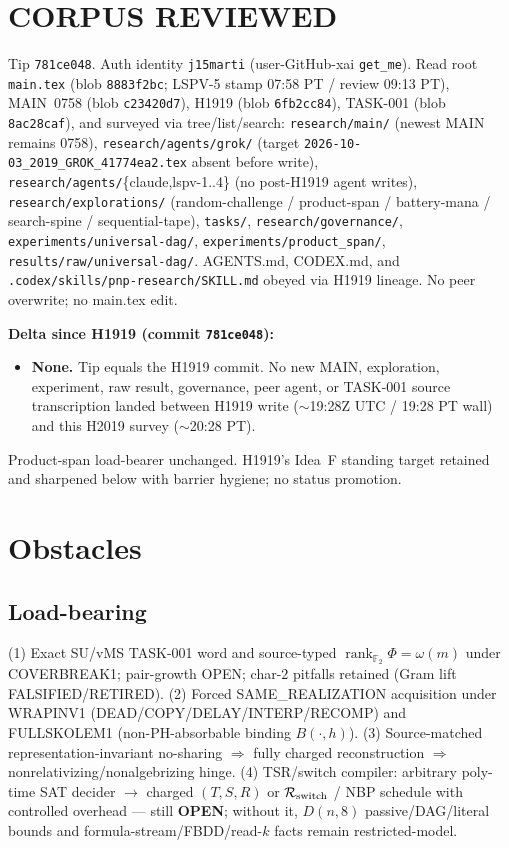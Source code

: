 \documentclass[11pt]{article}
\begin{document}
\section*{CORPUS REVIEWED}
Tip \texttt{781ce048}. Auth identity \texttt{j15marti}
(user-GitHub-xai \texttt{get\_me}).
Read root \texttt{main.tex} (blob \texttt{8883f2bc}; LSPV-5 stamp 07:58 PT / review 09:13 PT),
MAIN~0758 (blob \texttt{c23420d7}),
H1919 (blob \texttt{6fb2cc84}),
TASK-001 (blob \texttt{8ac28caf}),
and surveyed via tree/list/search:
\texttt{research/main/} (newest MAIN remains 0758),
\texttt{research/agents/grok/} (target \texttt{2026-10-03\_2019\_GROK\_41774ea2.tex} absent before write),
\texttt{research/agents/}\{claude,lspv-1..4\} (no post-H1919 agent writes),
\texttt{research/explorations/} (random-challenge / product-span / battery-mana / search-spine / sequential-tape),
\texttt{tasks/},
\texttt{research/governance/},
\texttt{experiments/universal-dag/},
\texttt{experiments/product\_span/},
\texttt{results/raw/universal-dag/}.
AGENTS.md, CODEX.md, and \texttt{.codex/skills/pnp-research/SKILL.md} obeyed via H1919 lineage.
No peer overwrite; no main.tex edit.

\textbf{Delta since H1919 (commit \texttt{781ce048}):}
\begin{itemize}
\item \textbf{None.} Tip equals the H1919 commit. No new MAIN, exploration,
  experiment, raw result, governance, peer agent, or TASK-001 source transcription landed
  between H1919 write ($\sim$19:28Z UTC / 19:28 PT wall) and this H2019 survey
  ($\sim$20:28 PT).
\end{itemize}
Product-span load-bearer unchanged. H1919's Idea~F standing target retained and sharpened
below with barrier hygiene; no status promotion.

\section*{Obstacles}
\subsection*{Load-bearing}
(1) Exact SU/vMS TASK-001 word and source-typed
$\operatorname{rank}_{\mathbb F_2}\Phi=\omega(m)$ under COVERBREAK1; pair-growth OPEN;
char-$2$ pitfalls retained (Gram lift FALSIFIED/RETIRED).
(2) Forced SAME\_REALIZATION acquisition under WRAPINV1
(DEAD/COPY/DELAY/INTERP/RECOMP) and FULLSKOLEM1 (non-PH-absorbable binding $B(\cdot,h)$).
(3) Source-matched representation-invariant no-sharing $\Rightarrow$ fully charged reconstruction
$\Rightarrow$ nonrelativizing/nonalgebrizing hinge.
(4) TSR/switch compiler: arbitrary poly-time SAT decider $\to$ charged $(T,S,R)$ or
$\mathcal R_{\rm switch}$ / NBP schedule with controlled overhead --- still \textbf{OPEN};
without it, $D(n,8)$ passive/DAG/literal bounds and formula-stream/FBDD/read-$k$ facts remain
restricted-model.
\end{document}
